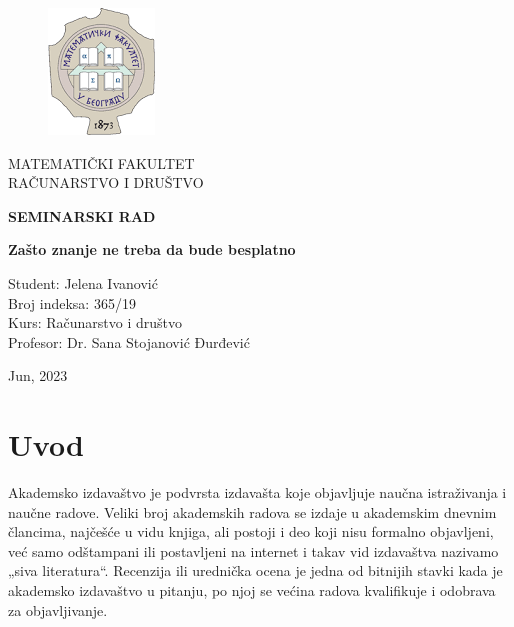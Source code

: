 \documentclass[12pt,a4paper]{article}
\begin{document}
\begin{titlepage}
	\begin{center}
		\vspace{1cm}
		
		\begin{figure} [h]
		\centering
		\includegraphics{logo.png}
		\end{figure}

		

		\vspace{0.5cm}
		\large MATEMATIČKI FAKULTET\\
		\large  RAČUNARSTVO I DRUŠTVO

		\vspace{3cm}

		\textbf{SEMINARSKI RAD}

		\vspace{3cm}

		\textbf{\Huge \vspace{0.5cm} Zašto znanje ne treba da bude besplatno}

		\vfill

		\vspace{0.8cm}

		Student: Jelena Ivanović\\
		Broj indeksa: 365/19\\
        Kurs: Računarstvo i društvo\\
        Profesor: Dr. Sana Stojanović Đurđević

		\vspace{1cm}

		Jun, 2023
	\end{center}
\end{titlepage}

\tableofcontents
\newpage
\listoffigures
\newpage
 
\section{\large{\textbf{Uvod}}}

\indent  Akademsko izdavaštvo je podvrsta izdavašta koje objavljuje naučna istraživanja i naučne radove. Veliki broj akademskih radova se izdaje u akademskim dnevnim člancima, najčešće u vidu knjiga, ali postoji i deo koji nisu formalno objavljeni, već samo odštampani ili postavljeni na internet i takav vid izdavaštva nazivamo „siva literatura“. Recenzija ili urednička ocena je jedna od bitnijih stavki kada je akademsko izdavaštvo u pitanju, po njoj se većina radova kvalifikuje i odobrava za objavljivanje.
\end{document}
